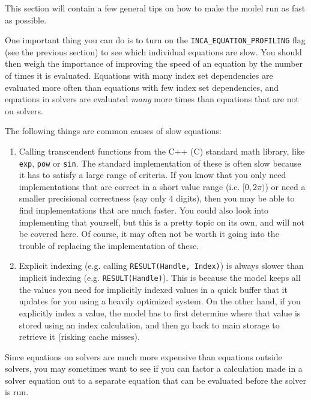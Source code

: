 \documentclass[11pt]{article}
\theoremstyle{definition}
\begin{document}
This section will contain a few general tips on how to make the model run as fast as possible.

One important thing you can do is to turn on the {\tt INCA\_EQUATION\_PROFILING} flag (see the previous section) to see which individual equations are slow. You should then weigh the importance of improving the speed of an equation by the number of times it is evaluated. Equations with many index set dependencies are evaluated more often than equations with few index set dependencies, and equations in solvers are evaluated \emph{many} more times than equations that are not on solvers.

The following things are common causes of slow equations:
\begin{enumerate}[i]
\item Calling transcendent functions from the C++ (C) standard math library, like {\tt exp}, {\tt pow} or {\tt sin}. The standard implementation of these is often slow because it has to satisfy a large range of criteria. If you know that you only need implementations that are correct in a short value range (i.e. $[0, 2\pi)$) or need a smaller precisional correctness (say only 4 digits), then you may be able to find implementations that are much faster. You could also look into implementing that yourself, but this is a pretty topic on its own, and will not be covered here. Of course, it may often not be worth it going into the trouble of replacing the implementation of these.
\item Explicit indexing (e.g. calling {\tt RESULT(Handle, Index)}) is always slower than implicit indexing (e.g. {\tt RESULT(Handle)}). This is because the model keeps all the values you need for implicitly indexed values in a quick buffer that it updates for you using a heavily optimized system. On the other hand, if you explicitly index a value, the model has to first determine where that value is stored using an index calculation, and then go back to main storage to retrieve it (risking cache misses).
\end{enumerate}

Since equations on solvers are much more expensive than equations outside solvers, you may sometimes want to see if you can factor a calculation made in a solver equation out to a separate equation that can be evaluated before the solver is run.
\end{document}
